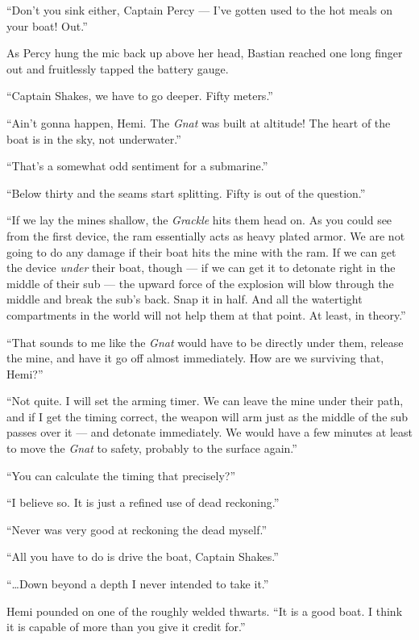 \documentclass[
]{scrbook}
\begin{document}
``Don't you sink either, Captain Percy --- I've gotten used to the hot
meals on your boat! Out.''

As Percy hung the mic back up above her head, Bastian reached one long
finger out and fruitlessly tapped the battery gauge.

\bigskip

``Captain Shakes, we have to go deeper. Fifty meters.''

``Ain't gonna happen, Hemi. The \emph{Gnat} was built at altitude! The
heart of the boat is in the sky, not underwater.''

``That's a somewhat odd sentiment for a submarine.''

``Below thirty and the seams start splitting. Fifty is out of the
question.''

``If we lay the mines shallow, the \emph{Grackle} hits them head on. As
you could see from the first device, the ram essentially acts as heavy
plated armor. We are not going to do any damage if their boat hits the
mine with the ram. If we can get the device \emph{under} their boat,
though --- if we can get it to detonate right in the middle of their sub
--- the upward force of the explosion will blow through the middle and
break the sub's back. Snap it in half. And all the watertight
compartments in the world will not help them at that point. At least, in
theory.''

``That sounds to me like the \emph{Gnat} would have to be directly under
them, release the mine, and have it go off almost immediately. How are
we surviving that, Hemi?''

``Not quite. I will set the arming timer. We can leave the mine under
their path, and if I get the timing correct, the weapon will arm just as
the middle of the sub passes over it --- and detonate immediately. We
would have a few minutes at least to move the \emph{Gnat} to safety,
probably to the surface again.''

``You can calculate the timing that precisely?''

``I believe so. It is just a refined use of dead reckoning.''

``Never was very good at reckoning the dead myself.''

``All you have to do is drive the boat, Captain Shakes.''

``\ldots Down beyond a depth I never intended to take it.''

Hemi pounded on one of the roughly welded thwarts. ``It is a good boat.
I think it is capable of more than you give it credit for.''
\end{document}
